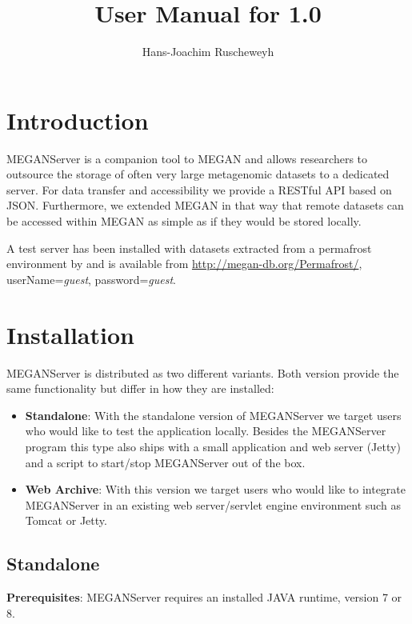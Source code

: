 \documentclass[11pt]{article}
\title{User Manual for \sf{MEGANServer}1.0}
\author{Hans-Joachim Ruscheweyh}
\begin{document}

\maketitle


{\small
\setcounter{tocdepth}{3}
\tableofcontents
}
\clearpage
\section{Introduction}


MEGANServer is a companion tool to MEGAN \citep{MEGAN2011} and allows researchers to outsource the storage of often very large metagenomic datasets to a dedicated server. For data transfer and accessibility we provide a RESTful API based on JSON. Furthermore, we extended MEGAN in that way that remote datasets can be accessed within MEGAN as simple as if they would be stored locally.

A test server has been installed with datasets extracted from a permafrost environment by \citep{Mackelprang2011}  and is available from \url{http://megan-db.org/Permafrost/}, userName=\textit{guest}, password=\textit{guest}.


\section{Installation}

MEGANServer is distributed as two different variants. Both version provide the same functionality but differ in how they are installed:

\begin{itemize}
\item \textbf{Standalone}: With the standalone version of MEGANServer we target users who would like to test the application locally. Besides the MEGANServer program this type also ships with a small application and web server (Jetty) and a script to start/stop MEGANServer out of the box.
\item \textbf{Web Archive}: With this version we target users who would like to integrate MEGANServer in an existing web server/servlet engine environment such as Tomcat or Jetty. 
\end{itemize}

\subsection{Standalone}
\textbf{Prerequisites}: MEGANServer requires an installed JAVA runtime, version 7 or 8.
\end{document}

